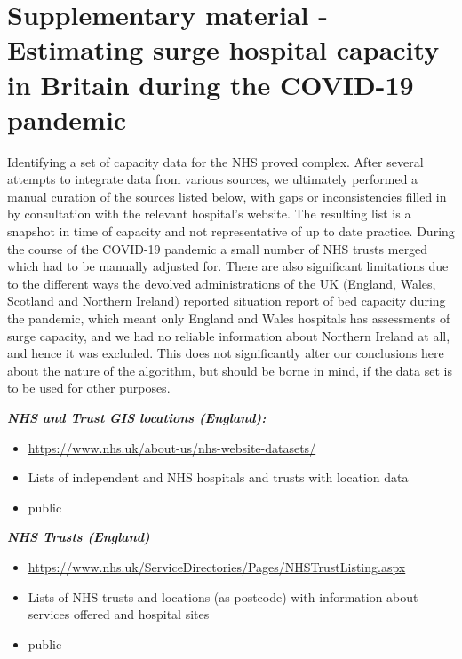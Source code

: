 \documentclass[
]{article}
\providecommand{\tightlist}{%
  \setlength{\itemsep}{0pt}\setlength{\parskip}{0pt}}
\begin{document}
\pagebreak

\hypertarget{supplementary-material---estimating-surge-hospital-capacity-in-britain-during-the-covid-19-pandemic}{%
\section{Supplementary material - Estimating surge hospital capacity in
Britain during the COVID-19
pandemic}\label{supplementary-material---estimating-surge-hospital-capacity-in-britain-during-the-covid-19-pandemic}}

Identifying a set of capacity data for the NHS proved complex. After
several attempts to integrate data from various sources, we ultimately
performed a manual curation of the sources listed below, with gaps or
inconsistencies filled in by consultation with the relevant hospital's
website. The resulting list is a snapshot in time of capacity and not
representative of up to date practice. During the course of the COVID-19
pandemic a small number of NHS trusts merged which had to be manually
adjusted for. There are also significant limitations due to the
different ways the devolved administrations of the UK (England, Wales,
Scotland and Northern Ireland) reported situation report of bed capacity
during the pandemic, which meant only England and Wales hospitals has
assessments of surge capacity, and we had no reliable information about
Northern Ireland at all, and hence it was excluded. This does not
significantly alter our conclusions here about the nature of the
algorithm, but should be borne in mind, if the data set is to be used
for other purposes.

\textbf{\emph{NHS and Trust GIS locations (England):}}

\begin{itemize}
\tightlist
\item
  \url{https://www.nhs.uk/about-us/nhs-website-datasets/}
\item
  Lists of independent and NHS hospitals and trusts with location data
\item
  public
\end{itemize}

\textbf{\emph{NHS Trusts (England)}}

\begin{itemize}
\tightlist
\item
  \url{https://www.nhs.uk/ServiceDirectories/Pages/NHSTrustListing.aspx}
\item
  Lists of NHS trusts and locations (as postcode) with information about
  services offered and hospital sites
\item
  public
\end{itemize}
\end{document}
